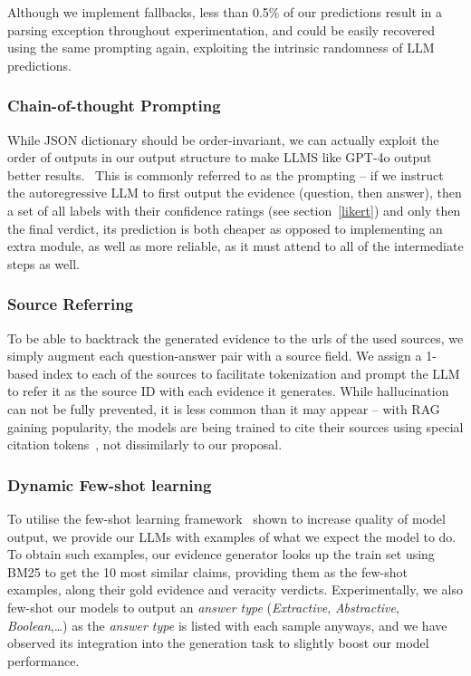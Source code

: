 Although we implement fallbacks, less than 0.5\% of our predictions result in a parsing exception throughout experimentation, and could be easily recovered using the same prompting again, exploiting the intrinsic randomness of LLM predictions.

\subsubsection{Chain-of-thought Prompting}
While JSON dictionary should be order-invariant, we can actually exploit the order of outputs in our output structure to make LLMS like GPT-4o output better results.~\cite{cot}
This is commonly referred to as the  prompting -- if we instruct the autoregressive LLM to first output the evidence (question, then answer), then a set of all labels with their confidence ratings (see section~\ref{likert}) and only then the final verdict, its prediction is both cheaper as opposed to implementing an extra module, as well as more reliable, as it must attend to all of the intermediate steps as well.

\subsubsection{Source Referring}
To be able to backtrack the generated evidence to the urls of the used sources, we simply augment each question-answer pair with a source field.
We assign a 1-based index to each of the sources to facilitate tokenization and prompt the LLM to refer it as the source ID with each evidence it generates.
While hallucination can not be fully prevented, it is less common than it may appear -- with RAG gaining popularity, the models are being trained to cite their sources using special citation tokens~\cite{menick2022teachinglanguagemodelssupport}, not dissimilarly to our proposal.

\subsubsection{Dynamic Few-shot learning}
To utilise the few-shot learning framework~\cite{fewshot} shown to increase quality of model output, we provide our LLMs with examples of what we expect the model to do.
To obtain such examples, our evidence generator looks up the \averitec{} train set using BM25 to get the 10 most similar claims, providing them as the few-shot examples, along their gold evidence and veracity verdicts.
Experimentally, we also few-shot our models to output an \textit{answer type} (\textit{Extractive}, \textit{Abstractive}, \textit{Boolean},\dots) as the \textit{answer type} is listed with each sample anyways, and we have observed its integration into the generation task to slightly boost our model performance.

